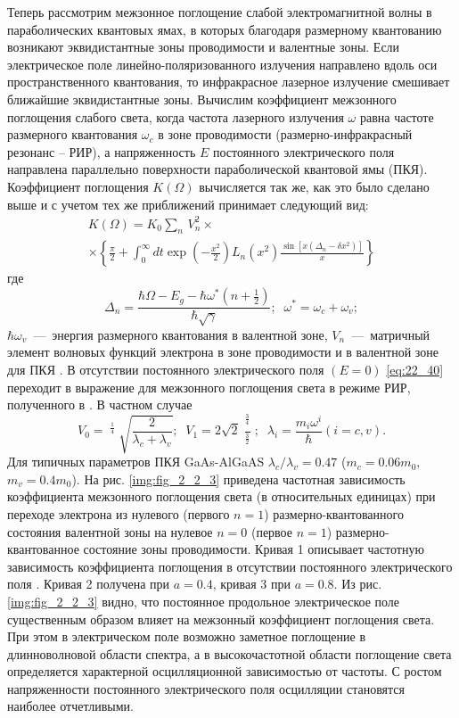 {Теперь рассмотрим межзонное поглощение слабой электромагнитной волны в параболических квантовых ямах, в которых благодаря размерному квантованию возникают эквидистантные зоны проводимости и валентные зоны. Если электрическое поле линейно-поляризованного излучения направлено вдоль оси пространственного квантования, то инфракрасное лазерное излучение смешивает ближайшие эквидистантные зоны. Вычислим коэффициент межзонного поглощения слабого света, когда частота лазерного излучения $\omega $ равна частоте размерного квантования $\omega _{c} $ в зоне проводимости (размерно-инфракрасный резонанс -- РИР), а напряженность $E$ постоянного электрического поля направлена параллельно поверхности параболической квантовой ямы (ПКЯ). Коэффициент поглощения $K(\Omega )$ вычисляется так же, как это было сделано выше и с учетом тех же приближений принимает следующий вид: 
\begin{multline} \label{eq:22_40} 
K(\Omega )=K_{0} \sum _{n} \, V_{n}^{2} \times  \\
\times \left\{\frac{\pi }{2} +\int _{0}^{\infty } dt \exp \left(-\frac{x^{2} }{2} \right)L_{n} \left(x^{2} \right)\frac{\sin \left[x\left(\Delta _{n} -\delta x^{2} \right)\right]}{x} \right\}
\end{multline} 
где 
\[\Delta _{n} =\frac{\hbar \Omega -E_{g} -\hbar \omega ^{*} \left(n+{\tfrac{1}{2}} \right)}{\hbar \sqrt{\gamma } } ;\; \; \omega ^{*} =\omega _{c} +\omega _{v} ;\] 
$\hbar \omega _{v} $~---~энергия размерного квантования в валентной зоне, $V_{n} $~---~матричный элемент волновых функций электрона в зоне проводимости и в валентной зоне для ПКЯ \cite{Sinyavskii2002}. В отсутствии постоянного электрического поля $(E=0)$ \eqref{eq:22_40} переходит в выражение для межзонного поглощения света в режиме РИР, полученного в \cite{Sinyavskii2002}. В частном случае 
\[V_{0} =\mathop{\left(\lambda _{c} \lambda _{v} \right)}\nolimits^{{\tfrac{1}{4}} } \sqrt{\frac{2}{\lambda _{c} +\lambda _{v} } } ;\; \; V_{1} =2\sqrt{2} \frac{\mathop{\left(\lambda _{c} \lambda _{v} \right)}\nolimits^{{\tfrac{3}{4}} } }{\mathop{\left(\lambda _{c} +\lambda _{v} \right)}\nolimits^{{\tfrac{3}{2}} } } ;\; \; \lambda _{i} =\frac{m_{i} \omega ^{i} }{\hbar } (i=c,v).\] 
Для типичных параметров ПКЯ GaAs-AlGaAS $\lambda _{c} /\lambda _{v} =0.47$ ($m_{c} =0.06m_{0} ,$ $m_{v} =0.4m_{0} $). На рис. \ref{img:fig_2_2_3} приведена частотная зависимость коэффициента межзонного поглощения света (в относительных единицах) при переходе электрона из нулевого (первого $n=1$) размерно-квантованного состояния валентной зоны на нулевое $n=0$ (первое $n=1$) размерно-квантованное состояние зоны проводимости. Кривая 1 описывает частотную зависимость коэффициента поглощения в отсутствии постоянного электрического поля \cite{Sinyavskii2002}. Кривая 2 получена при $a=0.4$, кривая 3 при $a=0.8$. Из рис. \ref{img:fig_2_2_3} видно, что постоянное продольное электрическое поле существенным образом влияет на межзонный коэффициент поглощения света. При этом в электрическом поле возможно заметное поглощение в длинноволновой области спектра, а в высокочастотной области поглощение света определяется характерной осцилляционной зависимостью от частоты. С ростом напряженности постоянного электрического поля осцилляции становятся наиболее отчетливыми. 
}

